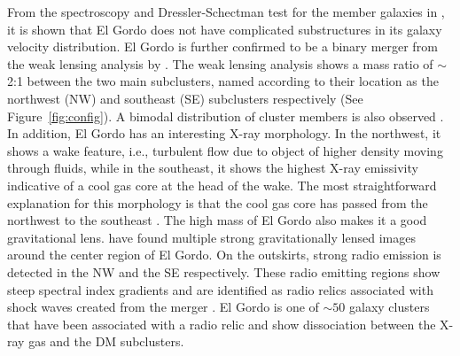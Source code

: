 \documentclass[letterpaper,useAMS,usenatbib]{mn2e}
\begin{document}
From the spectroscopy and Dressler-Schectman test for the member galaxies
in \cite{Sifon13}, it is shown that El Gordo does not have complicated
substructures in its galaxy velocity distribution. 
El Gordo is further confirmed to be a binary merger 
from the weak lensing analysis by \cite{Jee13}. The weak lensing analysis shows
a mass ratio of $\sim$2:1  between the two main subclusters, named
according to their location as the northwest (NW) and southeast (SE) subclusters respectively 
(See Figure~\ref{fig:config}). A bimodal distribution of cluster members is
also observed \citep{M12}. In addition, El Gordo has an interesting X-ray morphology. In the northwest, it shows a wake feature, i.e.,
turbulent flow due to object of higher density moving through fluids, while
in the southeast, it shows the highest X-ray emissivity indicative of a
cool gas core at the head of the wake. The most straightforward explanation for this morphology is that the
cool gas core has passed from the northwest to the southeast
\citep{M12}. 
The high mass of El Gordo also makes it a good
gravitational lens. \cite{Zitrin13} have found multiple strong
gravitationally lensed images around the center region of El Gordo. 
On the outskirts, strong radio emission is detected in
the NW and the SE respectively. These radio emitting regions show steep spectral
index gradients and are identified as radio relics associated with shock waves
created from the merger \citep{L13}. El Gordo is one of $\sim 50$ galaxy clusters that have
been associated with a radio relic and show dissociation between the X-ray
gas and the DM subclusters. \par 
\end{document}
